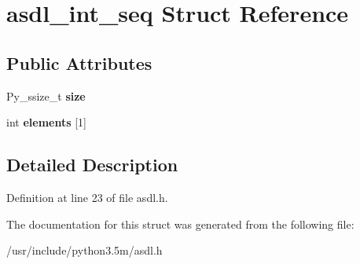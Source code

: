 \hypertarget{structasdl__int__seq}{}\section{asdl\+\_\+int\+\_\+seq Struct Reference}
\label{structasdl__int__seq}
\subsection*{Public Attributes}
\begin{DoxyCompactItemize}
\item 
Py\+\_\+ssize\+\_\+t {\bfseries size}\hypertarget{structasdl__int__seq_aa25ad22b75e01726d55030937871878b}{}\label{structasdl__int__seq_aa25ad22b75e01726d55030937871878b}

\item 
int {\bfseries elements} \mbox{[}1\mbox{]}\hypertarget{structasdl__int__seq_ae8d9dcdc0b90d0f395c650783adb095f}{}\label{structasdl__int__seq_ae8d9dcdc0b90d0f395c650783adb095f}

\end{DoxyCompactItemize}


\subsection{Detailed Description}


Definition at line 23 of file asdl.\+h.



The documentation for this struct was generated from the following file\+:\begin{DoxyCompactItemize}
\item 
/usr/include/python3.\+5m/asdl.\+h\end{DoxyCompactItemize}
